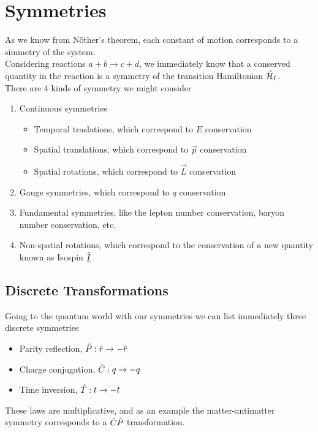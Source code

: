 \documentclass[../qm.tex]{subfiles}
\begin{document}
\section{Symmetries}
As we know from Nöther's theorem, each constant of motion corresponds to a simmetry of the system.\\
Considering reactions $a+b\to c+d$, we immediately know that a conserved quantity in the reaction is a symmetry of the transition Hamiltonian $\hat{\mathcal{H}}_I$.\\
There are 4 kinds of symmetry we might consider
\begin{enumerate}
\item Continuous symmetries
	\begin{itemize}
	\item Temporal traslations, which correspond to $E$ conservation
	\item Spatial translations, which correspond to $\vec{p}$ conservation
	\item Spatial rotations, which correspond to $\vec{L}$ conservation
	\end{itemize}
\item Gauge symmetries, which correspond to $q$ conservation
\item Fundamental symmetries, like the lepton number conservation, baryon number conservation, etc.
\item Non-spatial rotations, which correspond to the conservation of a new quantity known as Isospin $\hat{\underline{I}}$
\end{enumerate}
\subsection{Discrete Transformations}
Going to the quantum world with our symmetries we can list immediately three discrete symmetries
\begin{itemize}
\item Parity reflection, $\hat{P}:\hat{r}\to-\hat{r}$
\item Charge conjugation, $\hat{C}:q\to-q$
\item Time inversion, $\hat{T}:t\to-t$
\end{itemize}
These laws are multiplicative, and as an example the matter-antimatter symmetry corresponds to a $\hat{C}\hat{P}$ transformation.
\end{document}
